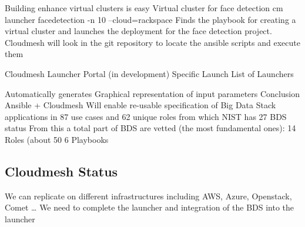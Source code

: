 Building enhance virtual clusters is easy
Virtual cluster for face detection
cm launcher facedetection -n 10 --cloud=rackspace
Finds the playbook for creating a virtual cluster and launches the deployment for the face detection project.
Cloudmesh will look in the git repository to locate the ansible scripts and execute them


Cloudmesh Launcher Portal (in development)
       Specific Launch                                    List of Launchers





Automatically generates Graphical representation of input parameters                                  
Conclusion
Ansible + Cloudmesh
Will enable re-usable specification of Big Data Stack applications in 87 use cases and 62 unique roles from which NIST has 27
BDS status
From this a total part of BDS are vetted (the most fundamental ones): 
14 Roles  (about 50%
6   Playbooks

\subsection{Cloudmesh Status}
We can replicate on different infrastructures including AWS, Azure, Openstack, Comet …
We need to complete the launcher and integration of the BDS into the launcher



